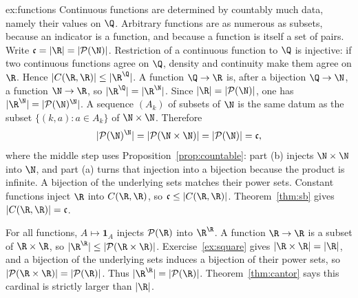 \begin{solution}{ex:functions}
\idea Continuous functions are determined by countably much data, namely their values on $\Q$. Arbitrary functions are as numerous as subsets, because an indicator is a function, and because a function is itself a set of pairs.
\writeup Write $\mathfrak c=|\R|=|\mathcal P(\N)|$. Restriction of a continuous function to $\Q$ is injective: if two continuous functions agree on $\Q$, density and continuity make them agree on $\R$. Hence $|C(\R,\R)|\le|\R^\Q|$. A function $\Q\to\R$ is, after a bijection $\Q\to\N$, a function $\N\to\R$, so $|\R^\Q|=|\R^\N|$. Since $|\R|=|\mathcal P(\N)|$, one has $|\R^\N|=|\mathcal P(\N)^\N|$. A sequence $(A_k)$ of subsets of $\N$ is the same datum as the subset $\{(k,a):a\in A_k\}$ of $\N\times\N$. Therefore
\[
|\mathcal P(\N)^\N|=|\mathcal P(\N\times\N)|=|\mathcal P(\N)|=\mathfrak c,
\]
where the middle step uses Proposition~\ref{prop:countable}: part (b) injects $\N\times\N$ into $\N$, and part (a) turns that injection into a bijection because the product is infinite. A bijection of the underlying sets matches their power sets. Constant functions inject $\R$ into $C(\R,\R)$, so $\mathfrak c\le|C(\R,\R)|$. Theorem~\ref{thm:sb} gives $|C(\R,\R)|=\mathfrak c$.

For all functions, $A\mapsto\mathbf 1_A$ injects $\mathcal P(\R)$ into $\R^\R$. A function $\R\to\R$ is a subset of $\R\times\R$, so $|\R^\R|\le|\mathcal P(\R\times\R)|$. Exercise~\ref{ex:square} gives $|\R\times\R|=|\R|$, and a bijection of the underlying sets induces a bijection of their power sets, so $|\mathcal P(\R\times\R)|=|\mathcal P(\R)|$. Thus $|\R^\R|=|\mathcal P(\R)|$. Theorem~\ref{thm:cantor} says this cardinal is strictly larger than $|\R|$.
\end{solution}

